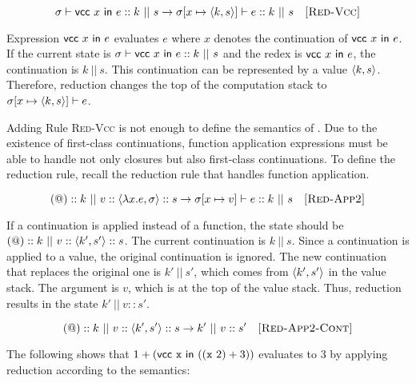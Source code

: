 \[
  \sigma\vdash\textsf{vcc}\ x\ \textsf{in}\ e::k\ ||\ s\rightarrow
  \sigma[x\mapsto\langle k,s\rangle]\vdash e::k\ ||\ s
  \quad\textsc{[Red-Vcc]}
\]

Expression $\textsf{vcc}\ x\ \textsf{in}\ e$ evaluates $e$ where $x$ denotes the
continuation of $\textsf{vcc}\ x\ \textsf{in}\ e$. If the current state is $\sigma\vdash\textsf{vcc}\ x\ \textsf{in}\ e::k\
||\ s$ and the redex is $\textsf{vcc}\ x\ \textsf{in}\ e$, the continuation is $k\ ||\ s$.
This continuation can be represented by a value $\langle k,s\rangle$. Therefore,
reduction changes the top of the
computation stack to $\sigma[x\mapsto\langle k,s\rangle]\vdash e$.

Adding Rule \textsc{Red-Vcc} is not enough to define the semantics of \lang.
Due to the existence of first-class continuations, function application
expressions must be able to handle not only closures but also first-class
continuations. To define the reduction rule, recall the reduction rule that
handles function application.

\[
  \appk k\ ||\ \conss{v}\conss{\clov{x}{e}{\sigma}}s\rightarrow
  \evalk{\sigma\lbrack x\mapsto v\rbrack}{e}k\ ||\ s
  \quad\textsc{[Red-App2]}
\]

If a continuation is applied instead of a function,
the state should be $\appk k\ ||\ \conss{v}\conss{\contv{k'}{s'}}s$.
The current continuation is $k\ ||\ s$. Since a continuation is applied to a
value, the original continuation is ignored. The new continuation that replaces the original
one is $k'\ ||\ s'$, which comes from $\langle k',s'\rangle$ in the value stack.
The argument is $v$, which is at the top of the value stack.
Thus, reduction results in the state $k'\ ||\ v::s'$.

\[
  \appk k\ ||\ \conss{v}\conss{\contv{k'}{s'}}s\rightarrow k'\ ||\ v::s'
  \quad\textsc{[Red-App2-Cont]}
\]

The following shows that $1+(\textsf{vcc}\ \cx\ \textsf{in}\ ((\cx\ 2)+3))$
evaluates to $3$ by applying reduction according to the semantics:

